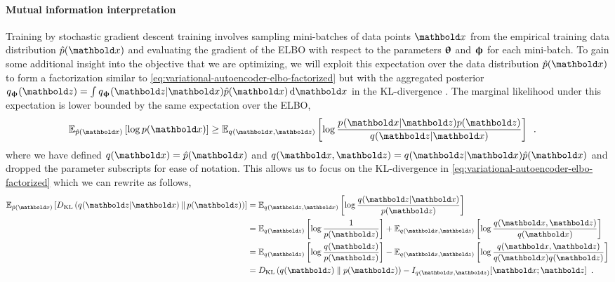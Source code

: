 \paragraph{Mutual information interpretation}
Training by stochastic gradient descent training involves sampling mini-batches of data points $\xb$ from the empirical training data distribution $\hat{p}(\xb)$ and evaluating the gradient of the ELBO with respect to the parameters ${\boldsymbol{\uptheta}}$ and ${\boldsymbol{\upphi}}$ for each mini-batch. 
To gain some additional insight into the objective that we are optimizing, we will exploit this expectation over the data distribution $\hat{p}(\xb)$ to form a factorization similar to \cref{eq:variational-autoencoder-elbo-factorized} but with the aggregated posterior $q_\phib(\zb) = \int q_\phib(\zb|\xb)\hat{p}(\xb)\,\mathrm{d}\xb$ in the KL-divergence \cite{tomczak_trouble_2022}. 
The marginal likelihood under this expectation is lower bounded by the same expectation over the ELBO,
%
\begin{align} \label{eq:variational-autoencoder-elbo-expected}
    \mathbb{E}_{\hat{p}(\xb)}\left[ \log p(\xb) \right] 
    &\geq \mathbb{E}_{q_{}(\xb,\zb)}\left[ \log \frac{p_{}(\xb|\zb)p(\zb)}{q_{}(\zb|\xb)} \right] \enspace .
\end{align}
%
where we have defined $q(\xb) = \hat{p}(\xb)$ and $q_{}(\xb,\zb) = q_{}(\zb|\xb)\hat{p}(\xb)$ and dropped the parameter subscripts for ease of notation. 
This allows us to focus on the KL-divergence in \cref{eq:variational-autoencoder-elbo-factorized} which we can rewrite as follows,
%
\begin{align} \label{eq:variational-autoencoder-kl-factor-expected}
    \mathbb{E}_{\hat{p}(\xb)} \left[ D_\text{KL}\left( q_{}(\zb|\xb) \,||\, p(\zb) \right) \right]
    &= \mathbb{E}_{q_{}(\zb,\xb)} \left[ \log \frac{q_{}(\zb|\xb)}{p(\zb)}\right] \nonumber \\
    &= \mathbb{E}_{q_{}(\zb)}\left[ \log \frac{1}{p(\zb)} \right] + \mathbb{E}_{q_{}(\xb,\zb)}\left[ \log \frac{q_{}(\xb,\zb)}{q(\xb)} \right] \nonumber \\
    &= \mathbb{E}_{q_{}(\zb)}\left[ \log \frac{q_{}(\zb)}{p(\zb)} \right] - \mathbb{E}_{q_{}(\xb,\zb)}\left[ \log \frac{q_{}(\xb,\zb)}{q(\xb)q_{}(\zb)} \right] \nonumber \\
    &= D_\mathrm{KL}\left( q_{}(\zb) \parallel p(\zb) \right) - I_{q_{}(\xb,\zb)}[\xb;\zb] \enspace .
\end{align}
